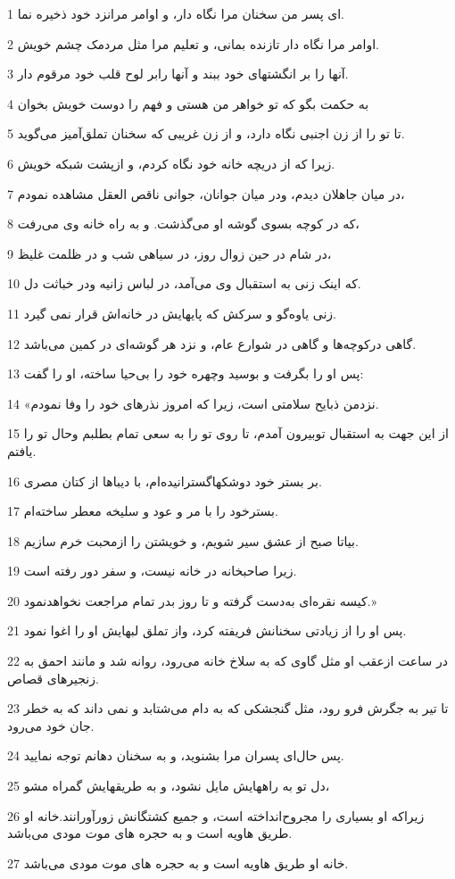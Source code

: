 \par 1 ای پسر من سخنان مرا نگاه دار، و اوامر مرانزد خود ذخیره نما.
\par 2 اوامر مرا نگاه دار تازنده بمانی، و تعلیم مرا مثل مردمک چشم خویش.
\par 3 آنها را بر انگشتهای خود ببند و آنها رابر لوح قلب خود مرقوم دار.
\par 4 به حکمت بگو که تو خواهر من هستی و فهم را دوست خویش بخوان
\par 5 تا تو را از زن اجنبی نگاه دارد، و از زن غریبی که سخنان تملق‌آمیز می‌گوید.
\par 6 زیرا که از دریچه خانه خود نگاه کردم، و ازپشت شبکه خویش.
\par 7 در میان جاهلان دیدم، ودر میان جوانان، جوانی ناقص العقل مشاهده نمودم،
\par 8 که در کوچه بسوی گوشه او می‌گذشت. و به راه خانه وی می‌رفت،
\par 9 در شام در حین زوال روز، در سیاهی شب و در ظلمت غلیظ،
\par 10 که اینک زنی به استقبال وی می‌آمد، در لباس زانیه ودر خباثت دل.
\par 11 زنی یاوه‌گو و سرکش که پایهایش در خانه‌اش قرار نمی گیرد.
\par 12 گاهی درکوچه‌ها و گاهی در شوارع عام، و نزد هر گوشه‌ای در کمین می‌باشد.
\par 13 پس او را بگرفت و بوسید وچهره خود را بی‌حیا ساخته، او را گفت:
\par 14 «نزدمن ذبایح سلامتی است، زیرا که امروز نذرهای خود را وفا نمودم.
\par 15 از این جهت به استقبال توبیرون آمدم، تا روی تو را به سعی تمام بطلبم وحال تو را یافتم.
\par 16 بر بستر خود دوشکهاگسترانیده‌ام، با دیباها از کتان مصری.
\par 17 بسترخود را با مر و عود و سلیخه معطر ساخته‌ام.
\par 18 بیاتا صبح از عشق سیر شویم، و خویشتن را ازمحبت خرم سازیم.
\par 19 زیرا صاحبخانه در خانه نیست، و سفر دور رفته است.
\par 20 کیسه نقره‌ای به‌دست گرفته و تا روز بدر تمام مراجعت نخواهدنمود.»
\par 21 پس او را از زیادتی سخنانش فریفته کرد، واز تملق لبهایش او را اغوا نمود.
\par 22 در ساعت ازعقب او مثل گاوی که به سلاخ خانه می‌رود، روانه شد و مانند احمق به زنجیرهای قصاص.
\par 23 تا تیر به جگرش فرو رود، مثل گنجشکی که به دام می‌شتابد و نمی داند که به خطر جان خود می‌رود.
\par 24 پس حال‌ای پسران مرا بشنوید، و به سخنان دهانم توجه نمایید.
\par 25 دل تو به راههایش مایل نشود، و به طریقهایش گمراه مشو،
\par 26 زیراکه او بسیاری را مجروح‌انداخته است، و جمیع کشتگانش زورآورانند.خانه او طریق هاویه است و به حجره های موت مودی می‌باشد.
\par 27 خانه او طریق هاویه است و به حجره های موت مودی می‌باشد.
 
